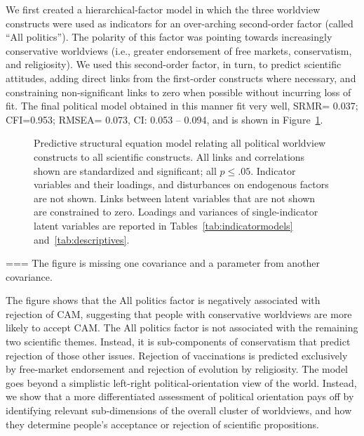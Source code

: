 \documentclass[fignum,man]{apa}\usepackage[]{graphicx}\usepackage[]{color}
\begin{document}
We first created a hierarchical-factor model in which the three worldview constructs 
were used as indicators for an over-arching second-order factor (called ``All politics''). 
The polarity of this factor was pointing towards increasingly conservative worldviews (i.e., greater
endorsement of free markets, conservatism, and religiosity). 
We used this second-order factor, in turn, to predict scientific 
attitudes, adding direct links from the first-order constructs where necessary,
and constraining non-significant links to zero when possible without
incurring loss of fit.
The final political model obtained in this manner fit very well,
SRMR=
0.037; 
CFI=0.953; RMSEA= 
0.073, CI:
0.053 -- 
0.094,
 and is shown in Figure~\ref{fig:finalpolSEM}.
\begin{figure}[tp] %
	\caption{Predictive structural equation model relating all political
		worldview constructs to all scientific constructs. 
		All links and correlations shown are 
		standardized and significant; all $p \leq .05$.
		Indicator variables and their loadings, and disturbances on endogenous factors are not
		shown. Links between latent variables that are not shown are 
		constrained to zero.
		Loadings and variances of single-indicator latent 
		variables are reported in Tables~\ref{tab:indicatormodels}
		and~\ref{tab:descriptives}.}
	\label{fig:finalpolSEM}
\end{figure}

=== The figure is missing one covariance and a parameter from another covariance. 

The figure shows that the All politics factor is negatively associated with rejection of CAM, suggesting that people with conservative worldviews
are more likely to accept CAM. The All politics factor is not associated with the remaining two scientific themes. Instead, it is sub-components
of conservatism that predict rejection of those other issues. Rejection of vaccinations is predicted exclusively by free-market endorsement and rejection of evolution 
by religiosity. 
The model goes beyond a simplistic left-right political-orientation view of the world. 
Instead, we show that a more differentiated assessment of political orientation 
pays off by identifying relevant sub-dimensions of the overall cluster of worldviews, and
how they determine people's acceptance or rejection of scientific propositions.
\end{document}
